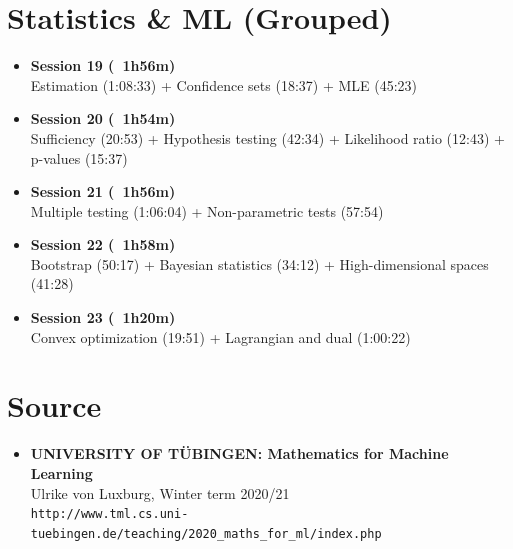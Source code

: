 \documentclass{article}
\begin{document}
\section*{Statistics \& ML (Grouped)}

\begin{itemize}
\item \textbf{Session 19 (~1h56m)}\\
Estimation (1:08:33) + Confidence sets (18:37) + MLE (45:23)

\item \textbf{Session 20 (~1h54m)}\\
Sufficiency (20:53) + Hypothesis testing (42:34) + Likelihood ratio (12:43) + p-values (15:37)

\item \textbf{Session 21 (~1h56m)}\\
Multiple testing (1:06:04) + Non-parametric tests (57:54)

\item \textbf{Session 22 (~1h58m)}\\
Bootstrap (50:17) + Bayesian statistics (34:12) + High-dimensional spaces (41:28)

\item \textbf{Session 23 (~1h20m)}\\
Convex optimization (19:51) + Lagrangian and dual (1:00:22)
\end{itemize}

\section*{Source}
\begin{itemize}
    \item \textbf{UNIVERSITY OF TÜBINGEN: Mathematics for Machine Learning} \\
    Ulrike von Luxburg, Winter term 2020/21 \\
    \texttt{http://www.tml.cs.uni-tuebingen.de/teaching/2020\_maths\_for\_ml/index.php}
\end{itemize}
\end{document}
